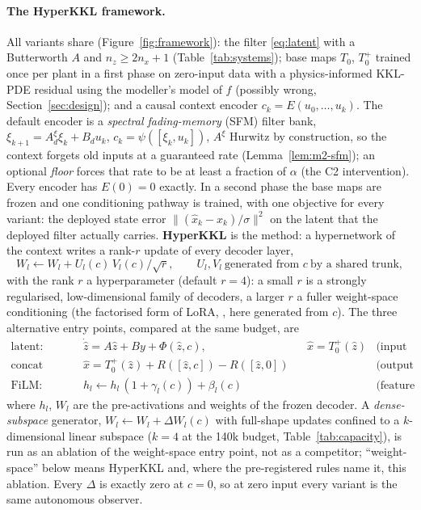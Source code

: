\paragraph{The HyperKKL framework.} All variants share (Figure~\ref{fig:framework}): the filter \eqref{eq:latent} with a Butterworth $A$ and $n_z\ge 2n_x+1$ (Table~\ref{tab:systems}); base maps $T_0$, $T_0^+$ trained once per plant in a first phase on zero-input data with a physics-informed KKL-PDE residual \citep{niazi2025kkl} using the modeller's model of $f$ (possibly wrong, Section~\ref{sec:design}); and a causal context encoder $c_k=E(u_0,\dots,u_k)$. The default encoder is a \emph{spectral fading-memory} (SFM) filter bank, $\xi_{k+1}=A^\xi_d\xi_k+B_du_k$, $c_k=\psi([\xi_k,u_k])$, $A^\xi$ Hurwitz by construction, so the context forgets old inputs at a guaranteed rate (Lemma~\ref{lem:m2-sfm}); an optional \emph{floor} forces that rate to be at least a fraction of $\alpha$ (the C2 intervention). Every encoder has $E(0)=0$ exactly. In a second phase the base maps are frozen and one conditioning pathway is trained, with one objective for every variant: the deployed state error $\|(\hat x_k-x_k)/\sigma\|^2$ on the latent that the deployed filter actually carries. \textbf{HyperKKL} is the method: a hypernetwork \citep{ha2016} of the context writes a rank-$r$ update of every decoder layer,
\begin{equation}\label{eq:hyperkkl}
W_l\leftarrow W_l+U_l(c)\,V_l(c)/\sqrt r,\qquad U_l,V_l\ \text{generated from }c\ \text{by a shared trunk},
\end{equation}
with the rank $r$ a hyperparameter (default $r=4$): a small $r$ is a strongly regularised, low-dimensional family of decoders, a larger $r$ a fuller weight-space conditioning (the factorised form of LoRA, \citealp{hu2022}, here generated from $c$). The three alternative entry points, compared at the same budget, are
\begin{align*}
\text{latent:}\quad & \dot{\hat z}=A\hat z+By+\Phi(\hat z,c), && \hat x=T_0^+(\hat z) & \text{(input enters the dynamics)}\\
\text{concat (additive):}\quad & \hat x=T_0^+(\hat z)+R([\hat z,c])-R([\hat z,0]) &&& \text{(output residual)}\\
\text{FiLM:}\quad & h_l\leftarrow h_l\,(1+\gamma_l(c))+\beta_l(c) &&& \text{(feature modulation)}
\end{align*}
where $h_l$, $W_l$ are the pre-activations and weights of the frozen decoder. A \emph{dense-subspace} generator, $W_l\leftarrow W_l+\Delta W_l(c)$ with full-shape updates confined to a $k$-dimensional linear subspace ($k=4$ at the 140k budget, Table~\ref{tab:capacity}), is run as an ablation of the weight-space entry point, not as a competitor; ``weight-space'' below means HyperKKL and, where the pre-registered rules name it, this ablation. Every $\Delta$ is exactly zero at $c=0$, so at zero input every variant is the same autonomous observer.

